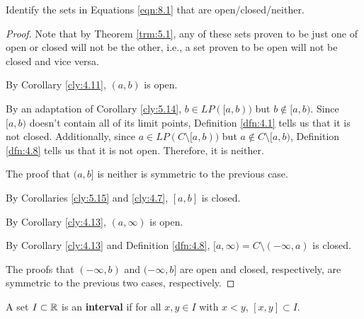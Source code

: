 \documentclass[../main.tex]{subfiles}
\begin{document}
\begin{exercise}\label{exr:8.1}
    Identify the sets in Equations \ref{eqn:8.1} that are open/closed/neither.
    \begin{proof}
        Note that by Theorem \ref{trm:5.1}, any of these sets proven to be just one of open or closed will not be the other, i.e., a set proven to be open will not be closed and vice versa.\par\smallskip
        By Corollary \ref{cly:4.11}, $(a,b)$ is open.\par
        By an adaptation of Corollary \ref{cly:5.14}, $b\in LP([a,b))$ but $b\notin[a,b)$. Since $[a,b)$ doesn't contain all of its limit points, Definition \ref{dfn:4.1} tells us that it is not closed. Additionally, since $a\in LP(C\setminus[a,b))$ but $a\notin C\setminus[a,b)$, Definition \ref{dfn:4.8} tells us that it is not open. Therefore, it is neither.\par
        The proof that $(a,b]$ is neither is symmetric to the previous case.\par
        By Corollaries \ref{cly:5.15} and \ref{cly:4.7}, $[a,b]$ is closed.\par
        By Corollary \ref{cly:4.13}, $(a,\infty)$ is open.\par
        By Corollary \ref{cly:4.13} and Definition \ref{dfn:4.8}, $[a,\infty)=C\setminus(-\infty,a)$ is closed.\par
        The proofs that $(-\infty,b)$ and $(-\infty,b]$ are open and closed, respectively, are symmetric to the previous two cases, respectively.
    \end{proof}
\end{exercise}

\begin{definition}\label{dfn:8.2}
    A set $I\subset\mathbb{R}$ is an \textbf{interval} if for all $x,y\in I$ with $x<y$, $[x,y]\subset I$.
\end{definition}
\pagebreak
\end{document}
